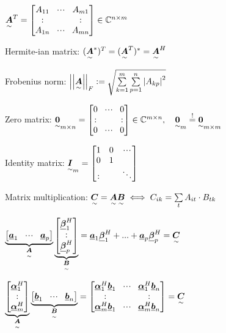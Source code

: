 $\ma{A}^T=\begin{bmatrix}A_{11}&\shdots&A_{m1}\\\svdots& &\svdots\\A_{1n} & \shdots& A_{mn}\end{bmatrix} \in \mathbb{C}^{n\times m}$

Hermite-ian matrix: $(\underset{\sim}{\boldsymbol {A}}^*)^T=(\underset{\sim}{\boldsymbol {A}}^T)^*=\underset{\sim}{\boldsymbol {A}}^H$

Frobenius norm: $\left|\left| \underset{\sim}{\boldsymbol {A}}\right|\right|_F := \sqrt{\sum\limits_{k=1}^m\sum\limits_{p=1}^n \left|A_{kp}\right|^2}$

Zero matrix: $\ma{0}_{m\times n}=\begin{bmatrix}0&\shdots&0\\\svdots&&\svdots\\0&\shdots&0\end{bmatrix}\in \mathbb{C}^{m\times n},\quad \ma{0}_m \overset{!}{=}\ma{0}_{m\times m}$

Identity matrix: $\underset{\sim}{\boldsymbol {I}}_m=\begin{bmatrix}1&0&\!\cdot \!\cdot\!\cdot\!\\0&1& \\:& &\ddots\end{bmatrix}$

Matrix multiplication: $\underset{\sim}{\boldsymbol {C}}=\underset{\sim}{\boldsymbol {A}}\underset{\sim}{\boldsymbol {B}} \iff C_{ik}=\sum\limits_{t}A_{it}\cdot B_{tk}$

$\underbrace{\begin{bmatrix}\underline{\boldsymbol {a}}_1&\!\cdot \!\cdot\!\cdot\!&\underline{\boldsymbol {a}}_p\end{bmatrix}}_{\underset{\sim}{\boldsymbol {A}}}
\underbrace{\begin{bmatrix}\underline{\boldsymbol {\beta}}_1^H\\:\\\underline{\boldsymbol {\beta}}_p^H\end{bmatrix}}_{\underset{\sim}{\boldsymbol {B}}}=
\underline{\boldsymbol {a}}_1\underline{\boldsymbol {\beta}}_1^H+...+\underline{\boldsymbol {a}}_p\underline{\boldsymbol {\beta}}_p^H=\underset{\sim}{\boldsymbol {C}}$

$\underbrace{\begin{bmatrix}\vec{\alpha}_1^H\\\svdots\\\vec{\alpha}_m^H\end{bmatrix}}_{\ma{A}}
\underbrace{\begin{bmatrix}\vec{b}_1&\shdots&\vec{b}_n\end{bmatrix}}_{\ma{B}} =
\begin{bmatrix}\vec{\alpha}_1^H\vec{b}_1&\shdots&\vec{\alpha}_1^H\vec{b}_n\\
\svdots& &\svdots\\
\vec{\alpha}_m^H\vec{b}_1&\shdots&\vec{\alpha}_m^H\vec{b}_n\end{bmatrix}=\ma{C}$

